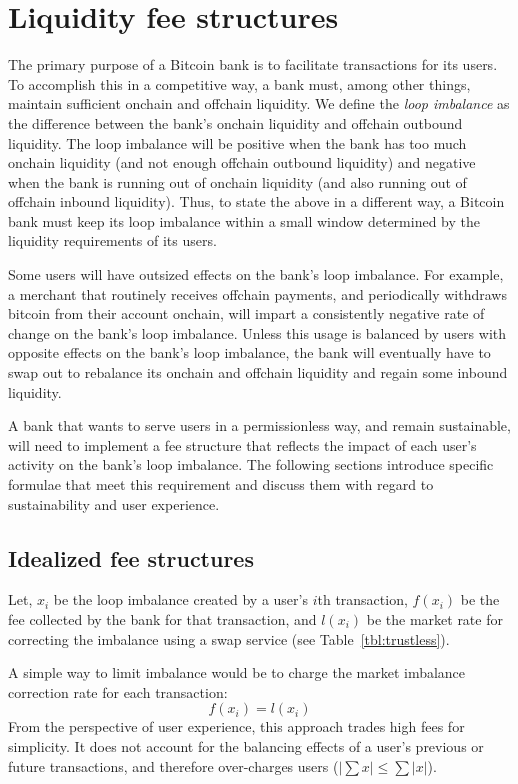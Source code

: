 \documentclass[10pt,twocolumn]{article}
\begin{document}
\section{Liquidity fee structures}

The primary purpose of a Bitcoin bank is to
facilitate transactions for its users.
To accomplish this in a competitive way,
a bank must, among other things,
maintain sufficient onchain and offchain liquidity.
We define the \emph{loop imbalance} as the difference between the bank's
onchain liquidity and offchain outbound liquidity.
The loop imbalance will be
positive when the bank has too much onchain liquidity
(and not enough offchain outbound liquidity)
and negative when the bank is running out of onchain liquidity
(and also running out of offchain inbound liquidity).
Thus, to state the above in a different way,
a Bitcoin bank must keep its loop imbalance within a
small window determined by the liquidity requirements of its users.

Some users will have outsized effects on the bank's loop imbalance.
For example, a merchant that routinely receives offchain payments,
and periodically withdraws bitcoin from their account onchain,
will impart a consistently negative rate of change on the bank's loop imbalance.
Unless this usage is balanced by users with opposite effects on the bank's loop imbalance,
the bank will eventually have to swap out to rebalance its onchain and offchain liquidity
and regain some inbound liquidity.

A bank that wants to serve users in a permissionless way,
and remain sustainable,
will need to implement a fee structure that
reflects the impact of each user's activity on the bank's loop imbalance.
The following sections introduce specific formulae
that meet this requirement
and discuss them with regard to
sustainability and user experience.

\subsection{Idealized fee structures}

Let,
$x_i$ be the loop imbalance created by a user's $i$th transaction,
$f(x_i)$ be the fee collected by the bank for that transaction,
and $l(x_i)$ be the market rate for correcting the imbalance using a swap service
(see Table~\ref{tbl:trustless}).

A simple way to limit imbalance would be to
charge the market imbalance correction rate for each transaction:
\begin{equation} \label{eq:simple}
	f(x_i) = l(x_i)
\end{equation}
From the perspective of user experience,
this approach trades high fees for simplicity.
It does not account for the balancing effects of
a user's previous or future transactions,
and therefore over-charges users ($ \left| \sum x \right| \leq \sum |x|$).
\end{document}
